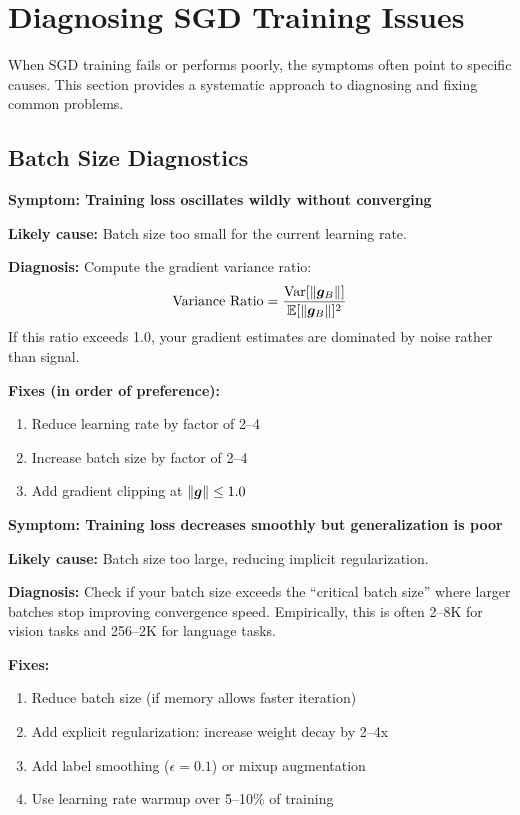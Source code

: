\documentclass[../../main.tex]{subfiles}
\begin{document}
\section{Diagnosing SGD Training Issues}
\label{sec:ch10-diagnosing}

When SGD training fails or performs poorly, the symptoms often point to specific causes. This section provides a systematic approach to diagnosing and fixing common problems.

\subsection{Batch Size Diagnostics}

\begin{important}
\textbf{Symptom: Training loss oscillates wildly without converging}

\textbf{Likely cause:} Batch size too small for the current learning rate.

\textbf{Diagnosis:} Compute the gradient variance ratio:
\[
    \text{Variance Ratio} = \frac{\operatorname{Var}[\left\lVert \boldsymbol{g}_B \right\rVert]}{\operatorname{\mathbb{E}}[\left\lVert \boldsymbol{g}_B \right\rVert]^2}
\]
If this ratio exceeds 1.0, your gradient estimates are dominated by noise rather than signal.

\textbf{Fixes (in order of preference):}
\begin{enumerate}
    \item Reduce learning rate by factor of 2--4
    \item Increase batch size by factor of 2--4
    \item Add gradient clipping at $\left\lVert \boldsymbol{g} \right\rVert \leq 1.0$
\end{enumerate}
\end{important}

\begin{important}
\textbf{Symptom: Training loss decreases smoothly but generalization is poor}

\textbf{Likely cause:} Batch size too large, reducing implicit regularization.

\textbf{Diagnosis:} Check if your batch size exceeds the ``critical batch size'' where larger batches stop improving convergence speed. Empirically, this is often 2--8K for vision tasks and 256--2K for language tasks.

\textbf{Fixes:}
\begin{enumerate}
    \item Reduce batch size (if memory allows faster iteration)
    \item Add explicit regularization: increase weight decay by 2--4x
    \item Add label smoothing ($\epsilon = 0.1$) or mixup augmentation
    \item Use learning rate warmup over 5--10\% of training
\end{enumerate}
\end{important}
\end{document}

